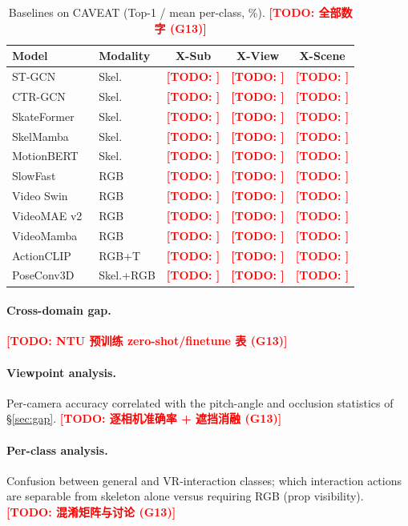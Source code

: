 \documentclass[10pt,twocolumn,letterpaper]{article}
\newcommand{\todocjkfont}{}
\newif\iftodos \todostrue   %
\newcommand{\todo}[1]{\iftodos\textcolor{red}{\textbf{[TODO: {\todocjkfont #1}]}}\fi}
\newcommand{\DATASET}{CAVEAT}
\begin{document}
\begin{table}[t]\centering\small
\caption{Baselines on \DATASET{} (Top-1 / mean per-class, \%).
\todo{全部数字 (G13)}}
\label{tab:baselines}
\begin{tabular}{@{}llccc@{}}
\toprule
Model & Modality & X-Sub & X-View & X-Scene \\
\midrule
ST-GCN~\cite{yan2018stgcn}             & Skel. & \todo{} & \todo{} & \todo{} \\
CTR-GCN~\cite{chen2021ctrgcn}          & Skel. & \todo{} & \todo{} & \todo{} \\
SkateFormer~\cite{do2024skateformer}   & Skel. & \todo{} & \todo{} & \todo{} \\
SkelMamba~\cite{martinel2024skelmamba} & Skel. & \todo{} & \todo{} & \todo{} \\
MotionBERT~\cite{zhu2023motionbert}    & Skel. & \todo{} & \todo{} & \todo{} \\
SlowFast~\cite{feichtenhofer2019slowfast} & RGB & \todo{} & \todo{} & \todo{} \\
Video Swin~\cite{liu2022videoswin}     & RGB   & \todo{} & \todo{} & \todo{} \\
VideoMAE v2~\cite{wang2023videomae2}   & RGB   & \todo{} & \todo{} & \todo{} \\
VideoMamba~\cite{li2024videomamba}     & RGB   & \todo{} & \todo{} & \todo{} \\
ActionCLIP~\cite{wang2021actionclip}   & RGB+T & \todo{} & \todo{} & \todo{} \\
PoseConv3D~\cite{duan2022poseconv3d}   & Skel.+RGB & \todo{} & \todo{} & \todo{} \\
\bottomrule
\end{tabular}
\end{table}

\paragraph{Cross-domain gap.} \todo{NTU 预训练 zero-shot/finetune 表 (G13)}
\paragraph{Viewpoint analysis.} Per-camera accuracy correlated with the
pitch-angle and occlusion statistics of \S\ref{sec:gap}.
\todo{逐相机准确率 + 遮挡消融 (G13)}
\paragraph{Per-class analysis.} Confusion between general and
VR-interaction classes; which interaction actions are separable from
skeleton alone versus requiring RGB (prop visibility).
\todo{混淆矩阵与讨论 (G13)}
\end{document}
